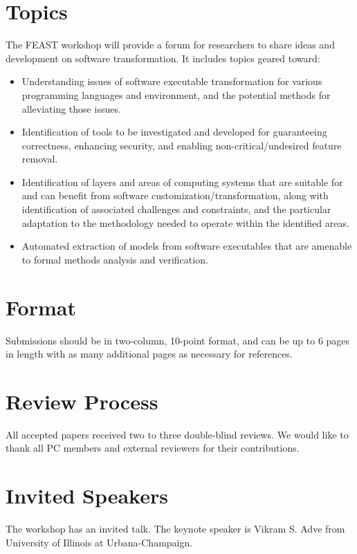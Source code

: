 \documentclass[sigconf]{acmart}
\begin{document}
\section{Topics}
The FEAST workshop will provide a forum for researchers to share
ideas and development on software transformation.
It includes topics geared toward:
\begin{itemize}

\item Understanding issues of software executable transformation for
  various programming languages and environment, and the potential
  methods for alleviating those issues.

\item Identification of tools to be investigated and developed for
  guaranteeing correctness, enhancing security, and enabling
  non-critical/undesired feature removal.

\item Identification of layers and areas of computing systems that are
  suitable for and can benefit from software
  customization/transformation, along with identification of
  associated challenges and constraints, and the particular adaptation
  to the methodology needed to operate within the identified areas.

\item Automated extraction of models from software executables that
  are amenable to formal methods analysis and verification.

\end{itemize}

\section{Format}
Submissions should be in two-column, 10-point
format, and can be up to 6 pages in length with as
many additional pages as necessary for references.

\section{Review Process}
All accepted papers received two to three double-blind reviews.
We would like to thank all PC members and external reviewers for
their contributions.

\section{Invited Speakers}
The workshop has an invited talk. %
The keynote speaker is Vikram S. Adve from 
University of Illinois at Urbana-Champaign.
\end{document}
